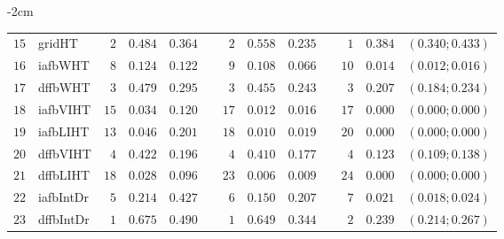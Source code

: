 \begin{table*}[!htbp]
\begin{adjustwidth*}{}{-2cm}
\begin{tabular}{@{}rlrrrrrrrrrcc@{}}
\footnotesize{$15$} & \footnotesize{gridHT   } & \footnotesize{$2 $} & \footnotesize{$0.484$} & \footnotesize{$0.364$} && \footnotesize{$2 $} & \footnotesize{$0.558$} & \footnotesize{$0.235$} && \footnotesize{$1 $} & \footnotesize{$0.384$} & \footnotesize{$(0.340;0.433)$} \\
\footnotesize{$16$} & \footnotesize{iafbWHT  } & \footnotesize{$8 $} & \footnotesize{$0.124$} & \footnotesize{$0.122$} && \footnotesize{$9 $} & \footnotesize{$0.108$} & \footnotesize{$0.066$} && \footnotesize{$10$} & \footnotesize{$0.014$} & \footnotesize{$(0.012;0.016)$} \\
\footnotesize{$17$} & \footnotesize{dffbWHT  } & \footnotesize{$3 $} & \footnotesize{$0.479$} & \footnotesize{$0.295$} && \footnotesize{$3 $} & \footnotesize{$0.455$} & \footnotesize{$0.243$} && \footnotesize{$3 $} & \footnotesize{$0.207$} & \footnotesize{$(0.184;0.234)$} \\
\footnotesize{$18$} & \footnotesize{iafbVIHT } & \footnotesize{$15$} & \footnotesize{$0.034$} & \footnotesize{$0.120$} && \footnotesize{$17$} & \footnotesize{$0.012$} & \footnotesize{$0.016$} && \footnotesize{$17$} & \footnotesize{$0.000$} & \footnotesize{$(0.000;0.000)$} \\
\footnotesize{$19$} & \footnotesize{iafbLIHT } & \footnotesize{$13$} & \footnotesize{$0.046$} & \footnotesize{$0.201$} && \footnotesize{$18$} & \footnotesize{$0.010$} & \footnotesize{$0.019$} && \footnotesize{$20$} & \footnotesize{$0.000$} & \footnotesize{$(0.000;0.000)$} \\
\footnotesize{$20$} & \footnotesize{dffbVIHT } & \footnotesize{$4 $} & \footnotesize{$0.422$} & \footnotesize{$0.196$} && \footnotesize{$4 $} & \footnotesize{$0.410$} & \footnotesize{$0.177$} && \footnotesize{$4 $} & \footnotesize{$0.123$} & \footnotesize{$(0.109;0.138)$} \\
\footnotesize{$21$} & \footnotesize{dffbLIHT } & \footnotesize{$18$} & \footnotesize{$0.028$} & \footnotesize{$0.096$} && \footnotesize{$23$} & \footnotesize{$0.006$} & \footnotesize{$0.009$} && \footnotesize{$24$} & \footnotesize{$0.000$} & \footnotesize{$(0.000;0.000)$} \\
\footnotesize{$22$} & \footnotesize{iafbIntDr} & \footnotesize{$5 $} & \footnotesize{$0.214$} & \footnotesize{$0.427$} && \footnotesize{$6 $} & \footnotesize{$0.150$} & \footnotesize{$0.207$} && \footnotesize{$7 $} & \footnotesize{$0.021$} & \footnotesize{$(0.018;0.024)$} \\
\footnotesize{$23$} & \footnotesize{dffbIntDr} & \footnotesize{$1 $} & \footnotesize{$0.675$} & \footnotesize{$0.490$} && \footnotesize{$1 $} & \footnotesize{$0.649$} & \footnotesize{$0.344$} && \footnotesize{$2 $} & \footnotesize{$0.239$} & \footnotesize{$(0.214;0.267)$} \\

\end{tabular}
\end{adjustwidth*}
\end{table*}
